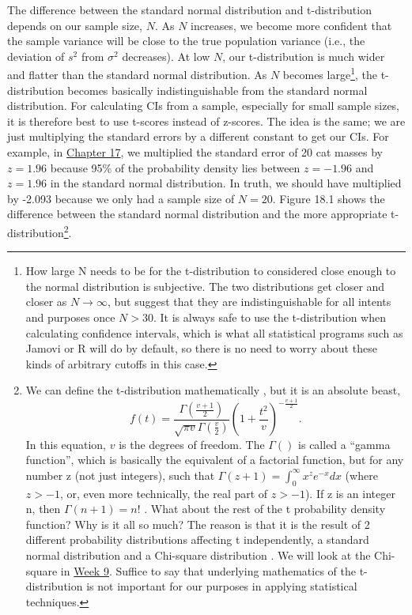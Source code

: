 \documentclass[
]{scrbook}
\begin{document}
The difference between the standard normal distribution and t-distribution depends on our sample size, \(N\).
As \(N\) increases, we become more confident that the sample variance will be close to the true population variance (i.e., the deviation of \(s^{2}\) from \(\sigma^{2}\) decreases).
At low \(N\), our t-distribution is much wider and flatter than the standard normal distribution.
As \(N\) becomes large\footnote{How large N needs to be for the t-distribution to considered close enough to the normal distribution is subjective. The two distributions get closer and closer as \(N \to \infty\), but \citet{Sokal1995} suggest that they are indistinguishable for all intents and purposes once \(N > 30\). It is always safe to use the t-distribution when calculating confidence intervals, which is what all statistical programs such as Jamovi or R will do by default, so there is no need to worry about these kinds of arbitrary cutoffs in this case.}, the t-distribution becomes basically indistinguishable from the standard normal distribution.
For calculating CIs from a sample, especially for small sample sizes, it is therefore best to use t-scores instead of z-scores.
The idea is the same; we are just multiplying the standard errors by a different constant to get our CIs.
For example, in \protect\hyperlink{Chapter_17}{Chapter 17}, we multiplied the standard error of 20 cat masses by \(z = 1.96\) because 95\% of the probability density lies between \(z = -1.96\) and \(z = 1.96\) in the standard normal distribution.
In truth, we should have multiplied by -2.093 because we only had a sample size of \(N = 20\).
Figure 18.1 shows the difference between the standard normal distribution and the more appropriate t-distribution\footnote{We can define the t-distribution mathematically \citep{Miller2004}, but it is an absolute beast, \[f(t) = \frac{\Gamma\left(\frac{v + 1}{2} \right)}{\sqrt{\pi v} \Gamma{\left(\frac{v}{2}\right)}}\left(1 + \frac{t^{2}}{v} \right)^{-\frac{v + 1}{2}}.\] In this equation, \(v\) is the degrees of freedom. The \(\Gamma\left(\right)\) is called a ``gamma function'', which is basically the equivalent of a factorial function, but for any number z (not just integers), such that \(\Gamma(z + 1) = \int_{0}^{\infty}x^{z}e^{-x}dx\) (where \(z > -1\), or, even more technically, the real part of \(z > -1\)). If z is an integer n, then \(\Gamma\left({n + 1}\right) = n!\) \citep{Borowski2005}. What about the rest of the t probability density function? Why is it all so much? The reason is that it is the result of 2 different probability distributions affecting t independently, a standard normal distribution and a Chi-square distribution \citep{Miller2004}. We will look at the Chi-square in \protect\hyperlink{Week_9}{Week 9}. Suffice to say that underlying mathematics of the t-distribution is not important for our purposes in applying statistical techniques.}.
\end{document}
